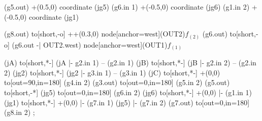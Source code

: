\documentclass[a4paper,12pt]{article}
\begin{document}
\begin{tasks}
\begin{circuitikz}[]
            (g5.out) +(0.5,0) coordinate (jg5)
            (g6.in 1) +(-0.5,0) coordinate (jg6)
            (g1.in 2) +(-0.5,0) coordinate (jg1)

            (g8.out) to[short,-o] ++(0.3,0) node[anchor=west](OUT2){$f_{(2)}$}
            (g6.out) to[short,-o] (g6.out -| OUT2.west) node[anchor=west](OUT1){$f_{(1)}$}

            (jA) to[short,*-] (jA |- g2.in 1) -- (g2.in 1)
            (jB) to[short,*-] (jB |- g2.in 2) -- (g2.in 2)
            (jg2) to[short,*-] (jg2 |- g3.in 1) -- (g3.in 1)
            (jC) to[short,*-] +(0,0) to[out=90,in=180] (g4.in 2)
            (g3.out) to[out=0,in=180] (g5.in 2)
            (g5.out) to[short,-*] (jg5) to[out=0,in=180] (g6.in 2)
            (jg6) to[short,*-] +(0,0) |- (g1.in 1)
            (jg1) to[short,*-] +(0,0) |- (g7.in 1)
            (jg5) |- (g7.in 2)
            (g7.out) to[out=0,in=180] (g8.in 2)
        ;
    \end{circuitikz}
    \vspace{6pt}




\end{tasks}
\end{document}
